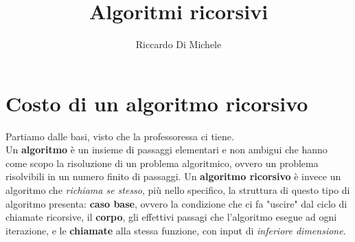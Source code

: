 \documentclass{article}
\begin{document}
\title{Algoritmi ricorsivi}
\author{Riccardo Di Michele}
\maketitle

\section*{Costo di un algoritmo ricorsivo}
Partiamo dalle basi, visto che la professoressa ci tiene. \\
Un \textbf{algoritmo} è un insieme di passaggi elementari e non ambigui 
che hanno come scopo la risoluzione di
un problema algoritmico, ovvero un problema risolvibili in un numero
finito di passaggi.
Un \textbf{algoritmo ricorsivo} è invece un algoritmo che 
\textit{richiama se stesso}, più nello specifico, la struttura di questo
tipo di algoritmo presenta: \textbf{caso base}, ovvero la condizione che
ci fa "uscire" dal ciclo di chiamate ricorsive, il \textbf{corpo}, gli
effettivi passagi che l'algoritmo esegue ad ogni iterazione, e le 
\textbf{chiamate} alla stessa funzione, con input 
di \textit{inferiore dimensione}.

\vspace{0.3cm}

\begin{algorithm}[H]
\caption{Search the value $v$ among the $n$ ordered elements of $S$}

\end{algorithm}
\end{document}
